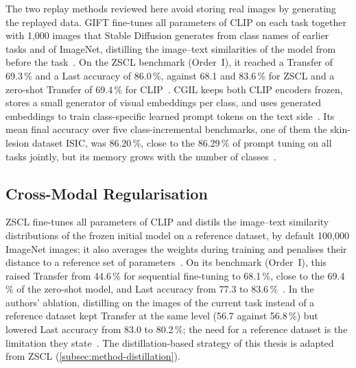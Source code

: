 The two replay methods reviewed here avoid storing real images by generating the replayed data.
GIFT fine-tunes all parameters of CLIP on each task together with 1{,}000 images that Stable Diffusion generates from class names of earlier tasks and of ImageNet, distilling the image--text similarities of the model from before the task~\cite{wu2024gift}.
On the ZSCL benchmark (Order~I), it reached a Transfer of 69.3\,\% and a Last accuracy of 86.0\,\%, against 68.1 and 83.6\,\% for ZSCL and a zero-shot Transfer of 69.4\,\% for CLIP~\cite{wu2024gift}.
CGIL keeps both CLIP encoders frozen, stores a small generator of visual embeddings per class, and uses generated embeddings to train class-specific learned prompt tokens on the text side~\cite{frascaroli2024clipgenerativelatentreplay}.
Its mean final accuracy over five class-incremental benchmarks, one of them the skin-lesion dataset ISIC, was 86.20\,\%, close to the 86.29\,\% of prompt tuning on all tasks jointly, but its memory grows with the number of classes~\cite{frascaroli2024clipgenerativelatentreplay}.

\subsection{Cross-Modal Regularisation}

ZSCL fine-tunes all parameters of CLIP and distils the image--text similarity distributions of the frozen initial model on a reference dataset, by default 100{,}000 ImageNet images; it also averages the weights during training and penalises their distance to a reference set of parameters~\cite{zheng2023preventingzeroshottransferdegradation}.
On its benchmark (Order~I), this raised Transfer from 44.6\,\% for sequential fine-tuning to 68.1\,\%, close to the 69.4\,\% of the zero-shot model, and Last accuracy from 77.3 to 83.6\,\%~\cite{zheng2023preventingzeroshottransferdegradation}.
In the authors' ablation, distilling on the images of the current task instead of a reference dataset kept Transfer at the same level (56.7 against 56.8\,\%) but lowered Last accuracy from 83.0 to 80.2\,\%; the need for a reference dataset is the limitation they state~\cite{zheng2023preventingzeroshottransferdegradation}.
The distillation-based strategy of this thesis is adapted from ZSCL (\cref{subsec:method-distillation}).

